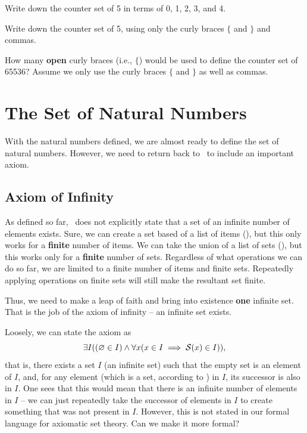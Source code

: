 \begin{exercise}
    \begin{partquestions}{\roman*}
        \item Write down the counter set of 5 in terms of 0, 1, 2, 3, and 4.
        \item Write down the counter set of 5, using only the curly braces $\{$ and $\}$ and commas.
        \item How many \textbf{open} curly braces (i.e., $\{$) would be used to define the counter set of 65536? Assume we only use the curly braces $\{$ and $\}$ as well as commas.
    \end{partquestions}
\end{exercise}

\section{The Set of Natural Numbers}
With the natural numbers defined, we are almost ready to define the set of natural numbers. However, we need to return back to \ZFC~to include an important axiom.

\subsection{Axiom of Infinity}
As defined so far, \ZFC~does not explicitly state that a set of an infinite number of elements exists. Sure, we can create a set based of a list of items (), but this only works for a \textbf{finite} number of items. We can take the union of a list of sets (), but this works only for a \textbf{finite} number of sets. Regardless of what operations we can do so far, we are limited to a finite number of items and finite sets. Repeatedly applying operations on finite sets will still make the resultant set finite.

Thus, we need to make a leap of faith and bring into existence \textbf{one} infinite set. That is the job of the axiom of infinity -- an infinite set exists.

Loosely, we can state the axiom as
\[
    \exists I ((\varnothing \in I) \land \forall x (x \in I \implies {\mathcal{S}(x)} \in I)),
\]
that is, there exists a set $I$ (an infinite set) such that the empty set is an element of $I$, and, for any element (which is a set, according to \ZFC) in $I$, its successor is also in $I$. One sees that this would mean that there is an infinite number of elements in $I$ -- we can just repeatedly take the successor of elements in $I$ to create something that was not present in $I$. However, this is not stated in our formal language for axiomatic set theory. Can we make it more formal?

